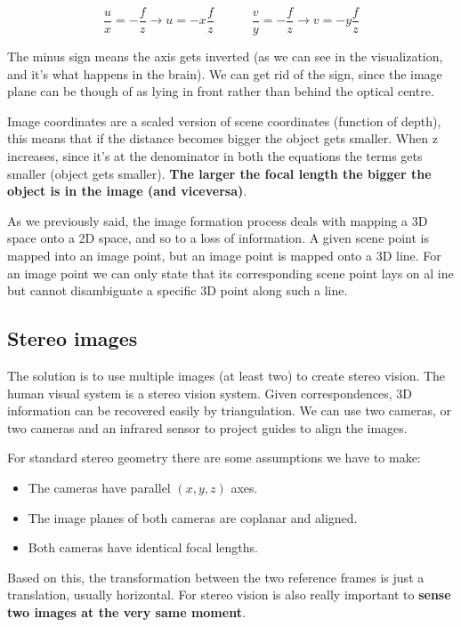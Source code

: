 \documentclass{article}
\begin{document}
$$\frac{u}{x} = -\frac{f}{z} \rightarrow u = -x\frac{f}{z} \quad\quad\quad \frac{v}{y} = - \frac{f}{z} \rightarrow v = -y\frac{f}{z}$$

The minus sign means the axis gets inverted (as we can see in the visualization, and it's what happens in the brain).
We can get rid of the sign, since the image plane can be though of as lying in front rather than behind the optical centre.

Image coordinates are a scaled version of scene coordinates (function of depth), this means that if the distance becomes bigger the object gets smaller.
When z increases, since it's at the denominator in both the equations the terms gets smaller (object gets smaller).
\textbf{The larger the focal length the bigger the object is in the image (and viceversa)}.

As we previously said, the image formation process deals with mapping a 3D space onto a 2D space, and so to a loss of information.
A given scene point is mapped into an image point, but an image point is mapped onto a 3D line.
For an image point we can only state that its corresponding scene point lays on al ine but cannot disambiguate a specific 3D point along such a line.

\subsection{Stereo images}

The solution is to use multiple images (at least two) to create stereo vision.
The human visual system is a stereo vision system.
Given correspondences, 3D information can be recovered easily by triangulation.
We can use two cameras, or two cameras and an infrared sensor to project guides to align the images.

For standard stereo geometry there are some assumptions we have to make:
\begin{itemize}
  \item The cameras have parallel $(x,y,z)$ axes.
  \item The image planes of both cameras are coplanar and aligned.
  \item Both cameras have identical focal lengths.
\end{itemize}

Based on this, the transformation between the two reference frames is just a translation, usually horizontal.
For stereo vision is also really important to \textbf{sense two images at the very same moment}.
\end{document}
